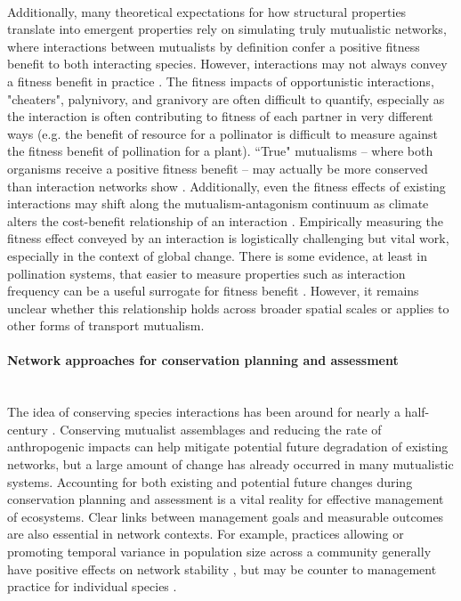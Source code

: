 \paragraph*{}
Additionally, many theoretical expectations for how structural properties translate into emergent properties rely on simulating truly mutualistic networks, where interactions between mutualists by definition confer a positive fitness benefit to both interacting species. However, interactions may not always convey a fitness benefit in practice \parencite{thomson2003mutualism}. The fitness impacts of opportunistic interactions, "cheaters", palynivory, and granivory are often difficult to quantify, especially as the interaction is often contributing to fitness of each partner in very different ways (e.g. the benefit of resource for a pollinator is difficult to measure against the fitness benefit of pollination for a plant). ``True" mutualisms -- where both organisms receive a positive fitness benefit -- may actually be more conserved than interaction networks show \parencite{burkle2011future, montesinos2017network}. Additionally, even the fitness effects of existing interactions may shift along the mutualism-antagonism continuum as climate alters the cost-benefit relationship of an interaction \parencite{toby2010mutualisms}. Empirically measuring the fitness effect conveyed by an interaction is logistically challenging but vital work, especially in the context of global change. There is some evidence, at least in pollination systems, that easier to measure properties such as interaction frequency can be a useful surrogate for fitness benefit \parencite{vazquez2005interaction}. However, it remains unclear whether this relationship holds across broader spatial scales or applies to other forms of transport mutualism.


\paragraph*{Network approaches for conservation planning and assessment}\mbox{}\\ 
The idea of conserving species interactions has been around for nearly a half-century \parencite{Janzen1974Deflowering}. Conserving mutualist assemblages and reducing the rate of anthropogenic impacts can help mitigate potential future degradation of existing networks, but a large amount of change has already occurred in many mutualistic systems. Accounting for both existing and potential future changes during conservation planning and assessment is a vital reality for effective management of ecosystems. Clear links between management goals and measurable outcomes are also essential in network contexts. For example, practices allowing or promoting temporal variance in population size across a community generally have positive effects on network stability \parencite{bascompte2022resilience}, but may be counter to management practice for individual species \parencite{tylianakis2010conservation}. 

